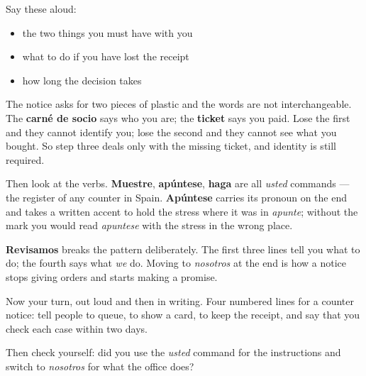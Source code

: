 Say these aloud:

\begin{itemize}
\raggedright
  \item the two things you must have with you
  \item what to do if you have lost the receipt
  \item how long the decision takes
\end{itemize}

\begin{culture}
The notice asks for two pieces of plastic and the words are not interchangeable. The \textbf{carné de socio} says who you are; the \textbf{ticket} says you paid. Lose the first and they cannot identify you; lose the second and they cannot see what you bought. So step three deals only with the missing ticket, and identity is still required.

Then look at the verbs. \textbf{Muestre}, \textbf{apúntese}, \textbf{haga} are all \emph{usted} commands — the register of any counter in Spain. \textbf{Apúntese} carries its pronoun on the end and takes a written accent to hold the stress where it was in \emph{apunte}; without the mark you would read \emph{apuntese} with the stress in the wrong place.

\textbf{Revisamos} breaks the pattern deliberately. The first three lines tell you what to do; the fourth says what \emph{we} do. Moving to \emph{nosotros} at the end is how a notice stops giving orders and starts making a promise.
\end{culture}

\begin{tcolorbox}[breakable,colback=teal!4,colframe=teal!35!black,title={Before you move on}]
Now your turn, out loud and then in writing. Four numbered lines for a counter notice: tell people to queue, to show a card, to keep the receipt, and say that you check each case within two days.

Then check yourself: did you use the \emph{usted} command for the instructions and switch to \emph{nosotros} for what the office does?
\end{tcolorbox}
